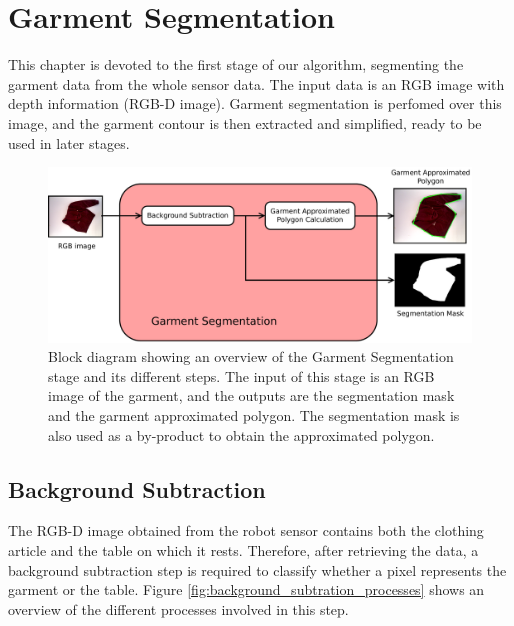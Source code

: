 \chapter{Garment Segmentation}
\label{garment_segmentation}

This chapter is devoted to the first stage of our algorithm, segmenting the garment data from the whole sensor data. The input data is an RGB image with depth information (RGB-D image). Garment segmentation is perfomed over this image, and the garment contour is then extracted and simplified, ready to be used in later stages. 

\begin{figure}[thpb]
    \centering
    \includegraphics[width=\textwidth]
    {figures/Garment-segmentation-diagram.pdf}
    \caption{Block diagram showing an overview of the Garment Segmentation stage and its different steps. The input of this stage is an RGB image of the garment, and the outputs are the segmentation mask and the garment approximated polygon. The segmentation mask is also used as a by-product to obtain the approximated polygon.}
    \label{fig:garment_segmentation_blocks}
\end{figure}


\section{Background Subtraction}
\label{background_subtraction}

The RGB-D image obtained from the robot sensor contains both the clothing article and the table on which it rests. Therefore, after retrieving the data, a background subtraction step is required to classify whether a pixel represents the garment or the table. Figure \ref{fig:background_subtration_processes} shows an overview of the different processes involved in this step.


